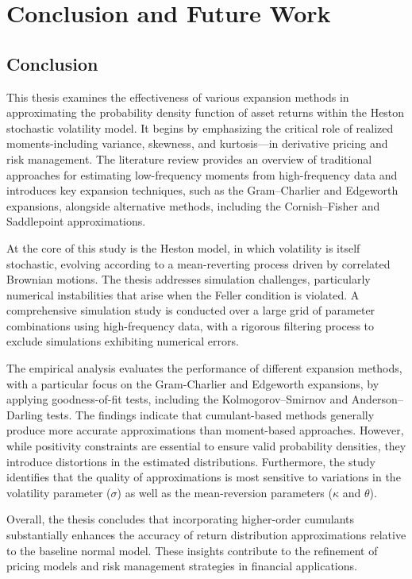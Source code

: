 \chapter{Conclusion and Future Work}
\label{sec:conclusion_future_work}

\section{Conclusion}

This thesis examines the effectiveness of various expansion methods in approximating the probability density function of asset returns within the Heston stochastic volatility model. It begins by emphasizing the critical role of realized moments-including variance, skewness, and kurtosis—in derivative pricing and risk management. The literature review provides an overview of traditional approaches for estimating low-frequency moments from high-frequency data and introduces key expansion techniques, such as the Gram–Charlier and Edgeworth expansions, alongside alternative methods, including the Cornish–Fisher and Saddlepoint approximations.

At the core of this study is the Heston model, in which volatility is itself stochastic, evolving according to a mean-reverting process driven by correlated Brownian motions. The thesis addresses simulation challenges, particularly numerical instabilities that arise when the Feller condition is violated. A comprehensive simulation study is conducted over a large grid of parameter combinations using high-frequency data, with a rigorous filtering process to exclude simulations exhibiting numerical errors.

The empirical analysis evaluates the performance of different expansion methods, with a particular focus on the Gram-Charlier and Edgeworth expansions, by applying good\-ness-of-fit tests, including the Kolmogorov–Smirnov and Anderson–Darling tests. The findings indicate that cumulant-based methods generally produce more accurate approximations than moment-based approaches. However, while positivity constraints are essential to ensure valid probability densities, they introduce distortions in the estimated distributions. Furthermore, the study identifies that the quality of approximations is most sensitive to variations in the volatility parameter ($\sigma$) as well as the mean-reversion parameters ($\kappa$ and $\theta$).

Overall, the thesis concludes that incorporating higher-order cumulants substantially enhances the accuracy of return distribution approximations relative to the baseline normal model. These insights contribute to the refinement of pricing models and risk management strategies in financial applications.

